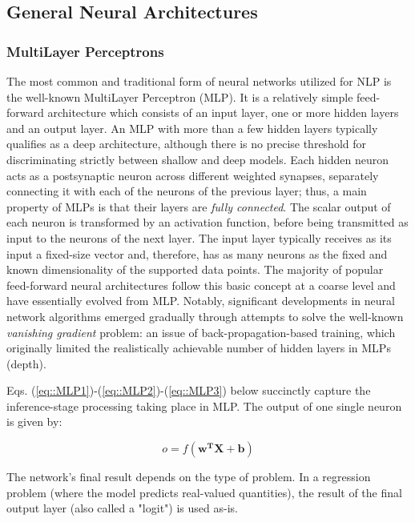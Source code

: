 \documentclass[preprint,review,12pt]{elsarticle}
\begin{document}
\subsection{General Neural Architectures}

\subsubsection{MultiLayer Perceptrons}
The most common and traditional form of neural networks utilized for NLP is the well-known MultiLayer Perceptron (MLP). It is a relatively simple feed-forward architecture which consists of an input layer, one or more hidden layers and an output layer. An MLP with more than a few hidden layers typically qualifies as a deep architecture, although there is no precise threshold for discriminating strictly between shallow and deep models. Each hidden neuron acts as a postsynaptic neuron across different weighted synapses, separately connecting it with each of the neurons of the previous layer; thus, a main property of MLPs is that their layers are \textit{fully connected}. The scalar output of each neuron is transformed by an activation function, before being transmitted as input to the neurons of the next layer. The input layer typically receives as its input a fixed-size vector and, therefore, has as many neurons as the fixed and known dimensionality of the supported data points. Τhe majority of popular feed-forward neural architectures follow this basic concept at a coarse level and have essentially evolved from MLP. Notably, significant developments in neural network algorithms emerged gradually through attempts to solve the well-known \textit{vanishing gradient} problem: an issue of back-propagation-based training, which originally limited the realistically achievable number of hidden layers in MLPs (depth).

Eqs. (\ref{eq::MLP1})-(\ref{eq::MLP2})-(\ref{eq::MLP3}) below succinctly capture the inference-stage processing taking place in MLP. The output of one single neuron is given by:

\begin{equation}
    o = f(\mathbf{w^T} \mathbf{X} + \mathbf{b})
\label{eq::MLP1}
\end{equation}


The network's final result depends on the type of problem. In a regression problem (where the model predicts real-valued quantities), the result of the final output layer (also called a "logit") is used as-is. 
\end{document}
